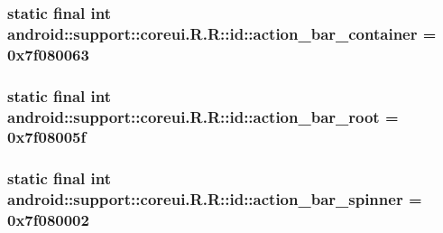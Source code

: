 \hypertarget{classandroid_1_1support_1_1coreui_1_1_r_1_1id_28457990bfe0fe3c057f6bb0993739ed}{
\subsubsection[{action\_\-bar\_\-container}]{\setlength{\rightskip}{0pt plus 5cm}static final int android::support::coreui.R.R::id::action\_\-bar\_\-container = 0x7f080063}}
\label{classandroid_1_1support_1_1coreui_1_1_r_1_1id_28457990bfe0fe3c057f6bb0993739ed}


\hypertarget{classandroid_1_1support_1_1coreui_1_1_r_1_1id_805d18365423f1f4f54236e3e8df63de}{
\subsubsection[{action\_\-bar\_\-root}]{\setlength{\rightskip}{0pt plus 5cm}static final int android::support::coreui.R.R::id::action\_\-bar\_\-root = 0x7f08005f}}
\label{classandroid_1_1support_1_1coreui_1_1_r_1_1id_805d18365423f1f4f54236e3e8df63de}


\hypertarget{classandroid_1_1support_1_1coreui_1_1_r_1_1id_c4ecc5e1ce8d75e034a556ba9fc90b60}{
\subsubsection[{action\_\-bar\_\-spinner}]{\setlength{\rightskip}{0pt plus 5cm}static final int android::support::coreui.R.R::id::action\_\-bar\_\-spinner = 0x7f080002}}
\label{classandroid_1_1support_1_1coreui_1_1_r_1_1id_c4ecc5e1ce8d75e034a556ba9fc90b60}


